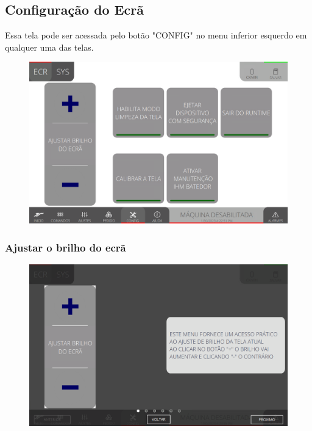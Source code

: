 \thispagestyle{fancy}
\vspace*{40 pt}
\subsection{Configuração do Ecrã} \label{sec:telaConfiguracaoTela}
Essa tela pode ser acessada pelo botão "CONFIG" no menu inferior esquerdo em qualquer uma das telas.
\vspace*{\fill}
\begin{figure}[h]
    \centering
    \includegraphics[width=576 px,height=360 px]{src/imagesICV/10-configuration/Tela-Principal.png}
\end{figure}
\vspace*{\fill}

\newpage
\thispagestyle{fancy}
\vspace*{40 pt}
\subsubsection{\small{Ajustar o brilho do ecrã}} \label{sec:telaConfiguracaoTelaAjustarBrilhoEcra}
\vspace*{\fill}
\begin{figure}[h]
    \centering
    \includegraphics[width=576 px,height=360 px]{src/imagesICV/10-configuration/1.png}
\end{figure}
\vspace*{\fill}

